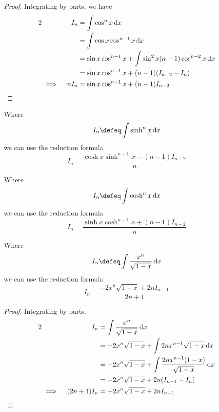 \begin{proof}
 Integrating by parts, we have
 \begin{alignat*}2
  && I_n &= \integ{\cos^n x}{x} \\
  &&     &= \integ{\cos x \cos^{n - 1}x}{x} \\
  &&     &= \sin x \cos^{n - 1} x +
             \integ{\sin^2 x (n - 1) \cos^{n - 2} x}{x} \\
  &&     &= \sin x \cos^{n - 1} x + (n - 1)(I_{n - 2} - I_n) \\
  &\implies{}& n I_n &= \sin x \cos^{n - 1} x + (n - 1)I_{n - 2} \qedhere
 \end{alignat*}
\end{proof}
\begin{theorem}
 Where
 \begin{equation*}
  I_n \defeq \integ{\sinh^n x}{x}
 \end{equation*}
 we can use the reduction formula
 \begin{equation*}
  I_n = \frac{\cosh x \sinh^{n - 1}x - (n - 1)I_{n - 2}} n
 \end{equation*}
\end{theorem}
\begin{theorem}
 Where
 \begin{equation*}
  I_n \defeq \integ{\cosh^n x}{x}
 \end{equation*}
 we can use the reduction formula
 \begin{equation*}
  I_n = \frac{\sinh x \cosh^{n - 1}x + (n - 1)I_{n - 2}} n
 \end{equation*}
\end{theorem}
\begin{theorem}
 Where
 \begin{equation*}
  I_n \defeq \integ{\frac{x^n}{\sqrt{1 - x}}}{x}
 \end{equation*}
 we can use the reduction formula
 \begin{equation*}
  I_n = \frac{-2x^n \sqrt{1 - x} + 2n I_{n - 1}}{2n + 1}
 \end{equation*}
\end{theorem}
\begin{proof}
 Integrating by parts,
 \begin{alignat*}2
  && I_n &= \integ{\frac{x^n}{\sqrt{1 - x}}}{x} \\
  &&     &= -2x^n \sqrt{1 - x} + \integ{2n x^{n - 1} \sqrt{1 - x}}{x} \\
  &&     &= -2x^n \sqrt{1 - x} + \integ{\frac{2n x^{n - 1}(1 - x)}
                                             {\sqrt{1 - x}}}{x} \\
  &&     &= -2x^n \sqrt{1 - x} + 2n (I_{n - 1} - I_n) \\
  &\implies{}& (2n + 1)I_n &= -2x^n \sqrt{1 - x} + 2n I_{n - 1} \qedhere
 \end{alignat*}
\end{proof}
